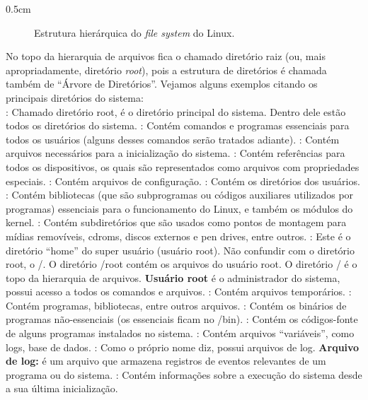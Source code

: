 \begin{refsection}
\begin {myindentpar}{0.5cm}
\begin{enumerate}[\itshape i.]
\begin{figure}[H]
      {\caption[\textit{Lunux File System}]{Estrutura hierárquica do \textit{file system} do Linux.}\label{tut1:fig:fs}}
  \end{figure}
No topo da hierarquia de arquivos fica o chamado diretório raiz (ou, mais apropriadamente, diretório \textit{root}), pois a estrutura de diretórios é chamada também de ``Árvore de Diretórios''. Vejamos alguns exemplos citando os principais diretórios do sistema:\\

  \subitem {\textbf{/}}: Chamado diretório root, é o diretório principal do sistema. Dentro dele estão todos os diretórios do sistema.
  : Contém comandos e programas essenciais para todos os usuários (alguns desses comandos serão tratados adiante).
  : Contém arquivos necessários para a inicialização do sistema.
  : Contém referências para todos os dispositivos, os quais são representados como arquivos com propriedades especiais.
  : Contém arquivos de configuração.
  : Contém os diretórios dos usuários.
  : Contém bibliotecas (que são subprogramas ou códigos auxiliares utilizados por programas) essenciais para o funcionamento do Linux, e também os módulos do kernel.
  : Contém subdiretórios que são usados como pontos de montagem para mídias removíveis, cdroms, discos externos e pen drives, entre outros.
  : Este é o diretório ``home'' do super usuário (usuário root). Não confundir com o diretório root, o /. O diretório /root contém os arquivos do usuário root. O diretório / é o topo da hierarquia de arquivos. \textbf{Usuário root} é o administrador do sistema, possui acesso a todos os comandos e arquivos.
  : Contém arquivos temporários.
  : Contém programas, bibliotecas, entre outros arquivos.
    : Contém os binários de programas não-essenciais (os essenciais ficam no /bin).
    : Contém os códigos-fonte de alguns programas instalados no sistema.
  : Contém arquivos ``variáveis'', como logs, base de dados.
    : Como o próprio nome diz, possui arquivos de log. \textbf{Arquivo de log:} é um arquivo que armazena registros de eventos relevantes de um programa ou do sistema.
    : Contém informações sobre a execução do sistema desde a sua última inicialização.


\end{enumerate}
\end{myindentpar}
\end{refsection}
